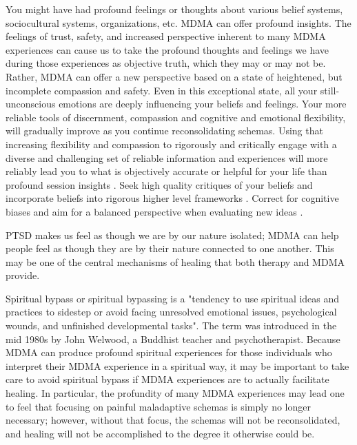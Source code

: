 \documentclass[12pt,letterpaper]{article}
\begin{document}
You might have had profound feelings or thoughts about various belief systems, sociocultural systems, organizations, etc. MDMA can offer profound insights. The feelings of trust, safety, and increased perspective inherent to many MDMA experiences can cause us to take the profound thoughts and feelings we have during those experiences as objective truth, which they may or  may not be. Rather, MDMA can offer a new perspective based on a state of heightened, but incomplete compassion and safety. Even in this exceptional state, all your still-unconscious emotions are deeply influencing your beliefs and feelings. Your more reliable tools of discernment, compassion and cognitive and emotional flexibility, will gradually improve as you continue reconsolidating schemas. Using that increasing flexibility and compassion to rigorously and critically engage with a diverse and challenging set of reliable information and experiences will more reliably lead you to what is objectively accurate or helpful for your life than profound session insights \cite{bentzMindfulInquiry}. Seek high quality critiques of your beliefs and incorporate beliefs into rigorous higher level frameworks \cite{saganDemon}. Correct for cognitive biases and aim for a balanced perspective when evaluating new ideas \cite{galefScoutMindset}.  

PTSD makes us feel as though we are by our nature isolated; MDMA can help people feel as though they are by their nature connected to one another. This may be one of the central mechanisms of healing that both therapy and MDMA provide.

Spiritual bypass or spiritual bypassing is a "tendency to use spiritual ideas and practices to sidestep or avoid facing unresolved emotional issues, psychological wounds, and unfinished developmental tasks".  The term was introduced in the mid 1980s by John Welwood, a Buddhist teacher and psychotherapist. Because MDMA can produce profound spiritual experiences for those individuals who interpret their MDMA experience in a spiritual way, it may be important to take care to avoid spiritual bypass if MDMA experiences are to actually facilitate healing. In particular, the profundity of many MDMA experiences may lead one to feel that focusing on painful maladaptive schemas is simply no longer necessary; however, without that focus, the schemas will not be reconsolidated, and healing will not be accomplished to the degree it otherwise could be.
\end{document}
